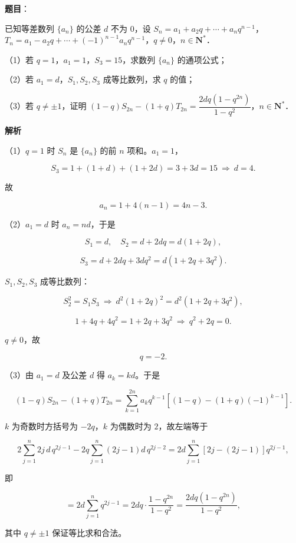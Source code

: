 \begin{answer}

\textbf{题目}：

已知等差数列 $\{a_n\}$ 的公差 $d$ 不为 $0$，设 $S_n=a_1+a_2q+\cdots+a_nq^{n-1}$，$T_n=a_1-a_2q+\cdots+(-1)^{n-1}a_nq^{n-1}$，$q\neq0$，$n\in\mathbf N^*$．

（1）若 $q=1$，$a_1=1$，$S_3=15$，求数列 $\{a_n\}$ 的通项公式；

（2）若 $a_1=d$，$S_1,S_2,S_3$ 成等比数列，求 $q$ 的值；

（3）若 $q\neq\pm1$，证明 $(1-q)S_{2n}-(1+q)T_{2n}=\dfrac{2dq(1-q^{2n})}{1-q^2}$，$n\in\mathbf N^*$．

\textbf{解析}

（1）$q=1$ 时 $S_n$ 是 $\{a_n\}$ 的前 $n$ 项和。$a_1=1$，

\nopagebreak[4]
\[S_3=1+(1+d)+(1+2d)=3+3d=15\ \Longrightarrow\ d=4 .\]

故

\nopagebreak[4]
\[a_n=1+4(n-1)=4n-3 .\]

（2）$a_1=d$ 时 $a_n=nd$，于是

\nopagebreak[4]
\[S_1=d,\quad S_2=d+2dq=d(1+2q),\]

\nopagebreak[4]
\[S_3=d+2dq+3dq^2=d(1+2q+3q^2).\]

$S_1,S_2,S_3$ 成等比数列：

\nopagebreak[4]
\[S_2^2=S_1S_3\ \Longrightarrow\
d^2(1+2q)^2=d^2(1+2q+3q^2),\]

\nopagebreak[4]
\[1+4q+4q^2=1+2q+3q^2
\ \Longrightarrow\ q^2+2q=0 .\]

$q\ne0$，故

\nopagebreak[4]
\[q=-2 .\]

（3）由 $a_1=d$ 及公差 $d$ 得 $a_k=kd$。于是

\nopagebreak[4]
\[(1-q)S_{2n}-(1+q)T_{2n}
=\sum_{k=1}^{2n}a_kq^{k-1}\left[(1-q)-(1+q)(-1)^{k-1}\right].\]

$k$ 为奇数时方括号为 $-2q$，$k$ 为偶数时为 $2$，故左端等于

\nopagebreak[4]
\[2\sum_{j=1}^{n}2j\,d\,q^{2j-1}-2q\sum_{j=1}^{n}(2j-1)d\,q^{2j-2}
=2d\sum_{j=1}^{n}\left[2j-(2j-1)\right]q^{2j-1},\]

即

\nopagebreak[4]
\[=2d\sum_{j=1}^{n}q^{2j-1}
=2dq\cdot\frac{1-q^{2n}}{1-q^2}
=\frac{2dq(1-q^{2n})}{1-q^2},\]

其中 $q\ne\pm1$ 保证等比求和合法。


\end{answer}
